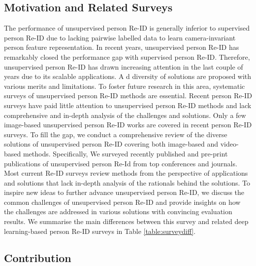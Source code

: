\documentclass[a4paper,fleqn]{cas-dc}
\begin{document}
\subsection{Motivation and Related Surveys}
The performance of unsupervised person Re-ID is generally inferior to supervised person Re-ID due to lacking pairwise labelled data to learn camera-invariant person feature representation. In recent years, unsupervised person Re-ID has remarkably closed the performance gap with supervised person Re-ID. Therefore, unsupervised person Re-ID has drawn increasing attention in the last couple of years due to its scalable applications. A d diversity of solutions are proposed with various merits and limitations. To foster future research in this area, systematic surveys of unsupervised person Re-ID methods are essential. Recent person Re-ID surveys have paid little attention to unsupervised person Re-ID methods and lack comprehensive and in-depth analysis of the challenges and solutions. Only a few image-based unsupervised person Re-ID works are covered in recent person Re-ID surveys. To fill the gap, we conduct a comprehensive review of the diverse solutions of unsupervised person Re-ID covering both image-based and video-based methods. Specifically, We surveyed recently published and pre-print publications of unsupervised person Re-Id from top conferences and journals. Most current Re-ID surveys review methods from the perspective of applications and solutions that lack in-depth analysis of the rationals behind the solutions. To inspire new ideas to further advance unsupervised person Re-ID, we discuss the common challenges of unsupervised person Re-ID and provide insights on how the challenges are addressed in various solutions with convincing evaluation results. We summarise the main differences between this survey and related deep learning-based person Re-ID surveys in Table \ref{table:surveydiff}.


\subsection{Contribution}
\end{document}
